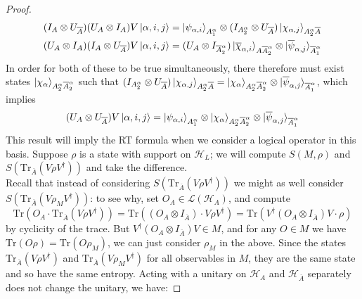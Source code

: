 \documentclass[12pt,a4paper]{article}
\numberwithin{equation}{section}
\newcommand{\ol}[1]{\overline{#1}}
\theoremstyle{definition}
\theoremstyle{theorem}
\theoremstyle{example}
\begin{document}
\begin{itemize}
\begin{proof}
\begin{equation}
				\begin{aligned}
					(I_{A}\otimes U_{\ol{A}})(U_{A}\otimes I_{A})V\ket{\alpha,i,j}&=\ket{\psi_{\alpha,i}}_{A_{1}^{\alpha}}\otimes(I_{A_{2}^{\alpha}}\otimes U_{\ol{A}})\ket{\chi_{\alpha,j}}_{A_{2}^{\alpha}\ol{A}}\\
					(U_{A}\otimes I_{A})(I_{A}\otimes U_{\ol{A}})V\ket{\alpha,i,j}&=(U_{A}\otimes I_{\ol{A}_{2}^{\alpha}})\ket{\ol{\chi}_{\alpha,i}}_{A\ol{A}_{2}^{\alpha}}\otimes\ket{\ol{\psi}_{\alpha,j}}_{\ol{A}_{1}^{\alpha}}
				\end{aligned}
			\end{equation}
			In order for both of these to be true simultaneously, there therefore must exist states $\ket{\chi_{\alpha}}_{A_{2}^{\alpha}\ol{A}_{2}^{\alpha}}$ such that $(I_{A_{2}^{\alpha}}\otimes U_{\ol{A}})\ket{\chi_{\alpha,j}}_{A_{2}^{\alpha}\ol{A}}=\ket{\chi_{\alpha}}_{A_{2}^{\alpha}\ol{A}_{2}^{\alpha}}\otimes\ket{\ol{\psi}_{\alpha,j}}_{\ol{A}_{1}^{\alpha}}$, which implies
			\begin{equation}
				(U_{A}\otimes U_{\ol{A}})V\ket{\alpha,i,j}=\ket{\psi_{\alpha,i}}_{A_{1}^{\alpha}}\otimes\ket{\chi_{\alpha}}_{A_{2}^{\alpha}\ol{A}_{2}^{\alpha}}\otimes\ket{\ol{\psi}_{\alpha,j}}_{\ol{A}_{1}^{\alpha}}
			\end{equation}
			This result will imply the RT formula when we consider a logical operator in this basis. Suppose $\rho$ is a state with support on $\mathcal{H}_{L}$; we will compute $S(M,\rho)$ and $S(\text{Tr}_{\ol{A}}(V\rho V^{\dagger}))$ and take the difference.\\
			Recall that instead of considering $S(\text{Tr}_{\ol{A}}(V\rho V^{\dagger}))$ we might as well consider $S(\text{Tr}_{\ol{A}}(V\rho_{M} V^{\dagger}))$: to see why, set $O_{A}\in \mathcal{L}(\mathcal{H}_{A})$, and compute
			\begin{equation}
				\text{Tr}(O_{A}\cdot\text{Tr}_{\ol{A}}(V\rho V^{\dagger}))=\text{Tr}((O_{A}\otimes I_{\ol{A}})\cdot V\rho V^{\dagger})=\text{Tr}(V^{\dagger}(O_{A}\otimes I_{\ol{A}})V\cdot\rho)
			\end{equation}
			by cyclicity of the trace. But $V^{\dagger}(O_{A}\otimes I_{\ol{A}})V\in M$, and for any $O\in M$ we have $\text{Tr}(O\rho)=\text{Tr}(O\rho_{M})$, we can just consider $\rho_{M}$ in the above. Since the states $\text{Tr}_{\ol{A}}(V\rho V^{\dagger})$ and $\text{Tr}_{\ol{A}}(V\rho_{M} V^{\dagger})$  for all observables in $M$, they are the same state and so have the same entropy. Acting with a unitary on $\mathcal{H}_{A}$ and $\mathcal{H}_{\ol{A}}$ separately does not change the unitary, we have:

\end{proof}
\end{itemize}
\end{document}
